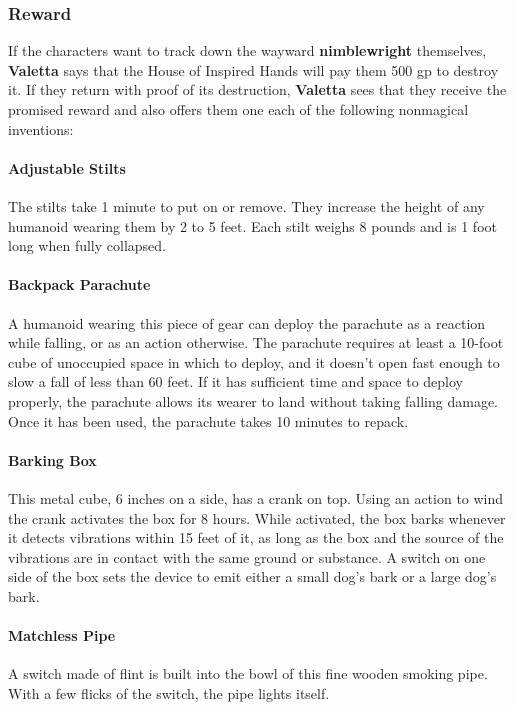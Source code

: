 \documentclass[10pt,a4paper,twoside,twocolumn,openany,nodeprecatedcode]{dndbook}
\begin{document}
\subsubsection{Reward}
If the characters want to track down the wayward \textbf{nimblewright} themselves, \textbf{Valetta} says that the House of Inspired Hands will pay them 500 gp to destroy it. If they return with proof of its destruction, \textbf{Valetta} sees that they receive the promised reward and also offers them one each of the following nonmagical inventions:
\paragraph{Adjustable Stilts}
The stilts take 1 minute to put on or remove. They increase the height of any humanoid wearing them by 2 to 5 feet. Each stilt weighs 8 pounds and is 1 foot long when fully collapsed.
\paragraph{Backpack Parachute}
A humanoid wearing this piece of gear can deploy the parachute as a reaction while falling, or as an action otherwise. The parachute requires at least a 10-foot cube of unoccupied space in which to deploy, and it doesn't open fast enough to slow a fall of less than 60 feet. If it has sufficient time and space to deploy properly, the parachute allows its wearer to land without taking falling damage. Once it has been used, the parachute takes 10 minutes to repack.
\paragraph{Barking Box}
This metal cube, 6 inches on a side, has a crank on top. Using an action to wind the crank activates the box for 8 hours. While activated, the box barks whenever it detects vibrations within 15 feet of it, as long as the box and the source of the vibrations are in contact with the same ground or substance. A switch on one side of the box sets the device to emit either a small dog's bark or a large dog's bark.
\paragraph{Matchless Pipe}
A switch made of flint is built into the bowl of this fine wooden smoking pipe. With a few flicks of the switch, the pipe lights itself.
\end{document}
